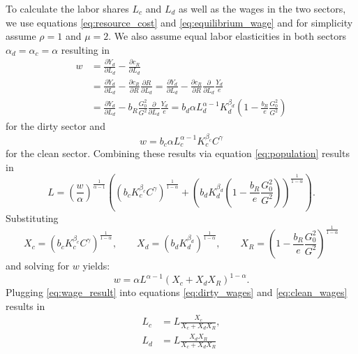 To calculate the labor shares $L_c$ and $L_d$ as well as the wages in the two sectors, we use equations \eqref{eq:resource_cost} and \eqref{eq:equilibrium_wage} and for simplicity assume $\rho=1$ and $\mu=2$. We also assume equal labor elasticities in both sectors $\alpha_d = \alpha_c = \alpha$ resulting in
\begin{align}
	w &= \frac{\partial Y_d}{\partial L_d} - \frac{\partial c_R}{\partial L_d} \nonumber \\
	&= \frac{\partial Y_d}{\partial L_d} - \frac{\partial c_R}{\partial R} \frac{\partial R}{\partial L_d} \nonumber = \frac{\partial Y_d}{\partial L_d} - \frac{\partial c_R}{\partial R} \frac{\partial}{\partial L_d} \frac{Y_d}{e} \nonumber \\
	&= \frac{\partial Y_d}{\partial L_d} - b_R\frac{G_0^2}{G^2} \frac{\partial}{\partial L_d} \frac{Y_d}{e} = b_d \alpha L_d^{\alpha-1} K_d^{\beta_d}\left( 1-\frac{b_R}{e}\frac{G_0^2}{G^2} \right)
	\label{eq:dirty_wages}
\end{align}
for the dirty sector and
\begin{equation}
	w = b_c \alpha L_c^{\alpha-1} K_c^{\beta_c} C^{\gamma}
	\label{eq:clean_wages}
\end{equation}
for the clean sector. Combining these results via equation \eqref{eq:population} results in
\begin{equation}
	L = \left( \frac{w}{\alpha} \right)^{\frac{1}{\alpha-1}}\left( \left( b_c K_c^{\beta_c}C^{\gamma} \right)^{\frac{1}{1-\alpha}} + \left( b_d K_d^{\beta_d} \left( 1 - \frac{b_R}{e}\frac{G_0^2}{G^2} \right) \right)^{\frac{1}{1-\alpha}} \right).
\end{equation}
Substituting 
\begin{equation}
	X_c = (b_c K_c^{\beta_c}C^{\gamma})^{\frac{1}{1-\alpha}}, \qquad X_d = (b_d K_d^{\beta_d})^{\frac{1}{1-\alpha}}, \qquad X_R = \left( 1 - \frac{b_R}{e}\frac{G_0^2}{G^2} \right)^{\frac{1}{1-\alpha}}
	\label{eq:substitutions}
\end{equation}
and solving for $w$ yields:
\begin{equation}
	w = \alpha L^{\alpha-1}\left( X_c + X_d X_R \right)^{1-\alpha}.
	\label{eq:wage_result}
\end{equation}
Plugging \eqref{eq:wage_result} into equations \eqref{eq:dirty_wages} and \eqref{eq:clean_wages} results in 
\begin{align}
	L_c &= L \frac{X_c}{X_c + X_d X_R}, \label{eq:clean_labor} \\
	L_d &= L \frac{X_d X_R}{X_c + X_d X_R} \label{eq:dirty_labor}
\end{align}
